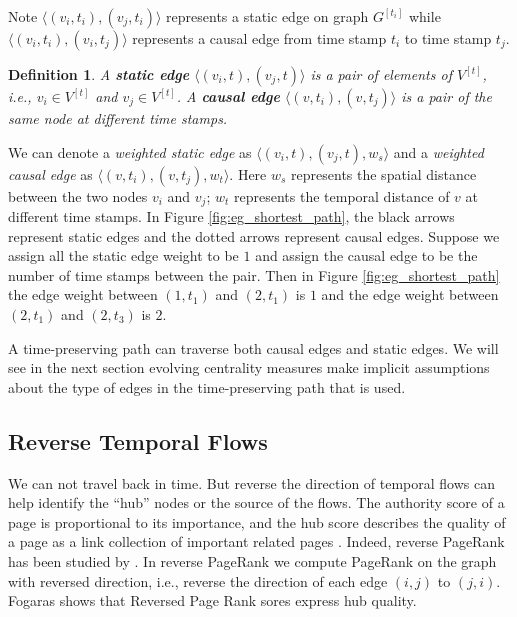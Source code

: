 \documentclass[12pt]{article}
\newtheorem{definition}{Definition}
\theoremstyle{definition}
\begin{document}
Note $\langle (v_i, t_i), (v_j, t_i) \rangle$ represents a static edge on graph $G^{[t_i]}$ while $\langle (v_i, t_i), (v_i, t_j) \rangle$ represents a causal edge from time stamp $t_i$ to time stamp $t_j$.

\begin{definition}
A \textbf{static edge} $\langle (v_i, t), (v_j, t)\rangle$ is a pair of elements of $V^{[t]}$, i.e., $v_i \in V^{[t]}$ and
$v_j \in V^{[t]}$.
 A \textbf{causal edge} $\langle (v, t_i), (v, t_j)\rangle$ is a pair of the same node at different time stamps.
\end{definition}

We can denote a \emph{weighted static edge} as $\langle (v_i, t), (v_j, t), w_s \rangle$ and a \emph{weighted causal edge} as $\langle (v, t_i), (v, t_j), w_t \rangle$.
Here $w_s$ represents the spatial distance between the two nodes $v_i$ and $v_j$; $w_t$ represents the
temporal distance of $v$ at different time stamps.
In Figure \ref{fig:eg_shortest_path}, the black arrows represent static edges and the dotted arrows represent causal edges.
Suppose we assign all the static edge weight to be $1$ and
assign the causal edge to be the number of time stamps between the pair. Then in Figure \ref{fig:eg_shortest_path}
the edge weight between $(1, t_1)$ and $(2, t_1)$ is $1$ and the edge weight between $(2, t_1)$ and $(2, t_3)$
 is $2$.

A time-preserving path can traverse both causal edges and static edges.
We will see in the next section evolving centrality measures make implicit assumptions about the type of edges in the
time-preserving path that is used.


\subsection{Reverse Temporal Flows}
\label{sec:reverse-temp-flows}

We can not travel back in time. But reverse the direction of temporal flows can help
identify the ``hub'' nodes or the source of the flows. The authority score of a page is
proportional to its importance, and the hub score describes the quality of a page as a link collection of important related pages \cite{kleinberg99}.
Indeed, reverse PageRank has
been studied by \cite{fogaras03, bar08, gleich15}. In reverse PageRank we compute PageRank on the graph with reversed direction, i.e., reverse the direction of each edge $(i,j)$ to $(j, i)$.
Fogaras \cite{fogaras03} shows that Reversed Page Rank sores express hub quality.
\end{document}
